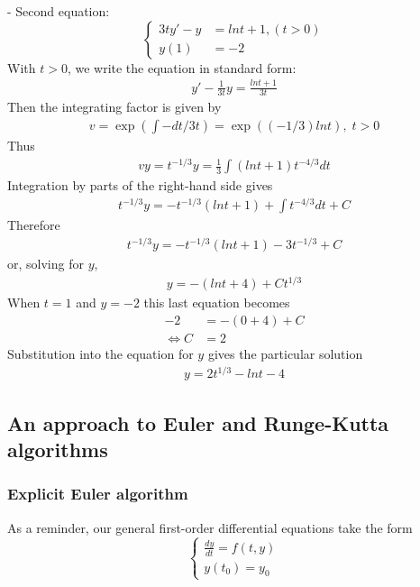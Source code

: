 \documentclass[a4paper]{article}
\begin{document}
- Second equation:
\begin{equation*}
  \begin{cases}
    3ty' - y & = lnt + 1, (t > 0) \\
    y(1)     & = -2
  \end{cases}
\end{equation*}
With \(t > 0\), we write the equation in standard form:
\begin{align*}
  y' - \frac{1}{3t}y = \frac{lnt + 1}{3t}
\end{align*}
Then the integrating factor is given by
\begin{align*}
  v = \exp \left(\int -dt/3t\right) = \exp((-1/3)lnt), \;t > 0
\end{align*}
Thus
\begin{align*}
  vy = t^{-1/3} y = \frac{1}{3} \int(lnt + 1) t^{-4/3} dt
\end{align*}
Integration by parts of the right-hand side gives
\begin{align*}
  t^{-1/3}y = -t^{-1/3}(lnt+1) + \int t^{-4/3}dt + C
\end{align*}
Therefore
\begin{align*}
  t^{-1/3}y = -t^{-1/3}(lnt+1) - 3t^{-1/3} + C
\end{align*}
or, solving for \(y\),
\begin{align*}
  y = -(lnt + 4) + Ct^{1/3}
\end{align*}
When \(t = 1\) and \(y = -2\) this last equation becomes
\begin{align*}
  -2                & = -(0+4) + C \\
  \Leftrightarrow C & = 2
\end{align*}
Substitution into the equation for \(y\) gives the particular solution
\begin{align*}
  y = 2t^{1/3} - lnt - 4
\end{align*}

\subsection{An approach to Euler and Runge-Kutta algorithms}
\subsubsection{Explicit Euler algorithm}\label{sssec:explicit_euler}
As a reminder, our general first-order differential equations take the form
\begin{equation*}
  \begin{cases}
    \frac{dy}{dt} = f(t,y) \\
    y(t_0) = y_0
  \end{cases}
\end{equation*}
\end{document}
